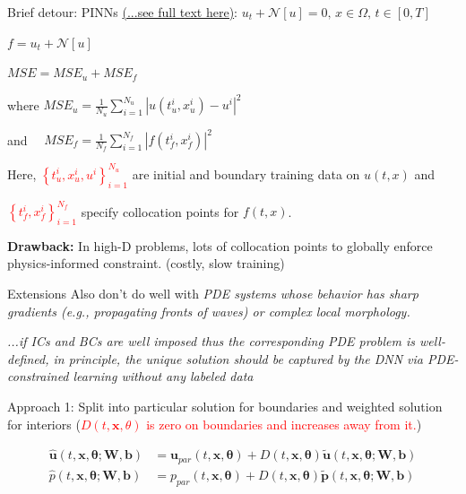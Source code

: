 \documentclass[usenames,dvipsnames]{beamer}
\theoremstyle{definition}
\let\oldcite=\cite
\renewcommand{\cite}[2][]{\textcolor{green}{\oldcite[#1]{#2}}}
\begin{document}
\begin{frame}{Brief detour: PINNs}
  \cite{Raissi2019} \href{www.sciencedirect.com/science/article/pii/S0021999118307125}{(...see full text here)}: 
    $u_t+\mathcal{N}[u]=0, \, x\in\Omega, \, t\in[0,T]$

    $f = u_t+\mathcal{N}[u]$

    $MSE=MSE_u+MSE_f$

    where $MSE_u=\frac{1}{N_u}\sum_{i=1}^{N_u}|u(t_u^i,x_u^i)-u^i|^2$

    and $\quad MSE_f=\frac{1}{N_f}\sum_{i=1}^{N_f}|f(t_f^i,x_f^i)|^2$

    Here, \textcolor{red}{$\left\{t_{u}^{i},x_{u}^{i},u^{i}\right\}_{i=1}^{N_{u}}$} are initial and boundary training data on $u(t, x)$ and 

    \textcolor{red}{$\left\{t_{f}^{i},x_{f}^{i}\right\}_{i=1}^{N_{f}}$} specify collocation points for $f(t, x)$.

    \textbf{Drawback: } In high-D problems, lots of collocation points to globally enforce physics-informed constraint. (costly, slow training)
\end{frame}

\begin{frame}{Extensions}
    Also don't do well with \emph{PDE systems whose behavior has sharp gradients (e.g., propagating fronts of waves) or complex
    local morphology. } \cite{ren_phycrnet:_2022}

    \cite{sun_surrogate_2020} \emph{...if ICs and BCs are well imposed thus the corresponding PDE problem is well-defined, in principle, the unique solution should be captured by the DNN via PDE-constrained learning without any labeled data}

    Approach 1: Split into particular solution for boundaries and weighted solution for interiors (\textcolor{red}{$D(t, \mathbf{x}, \theta)$ is zero on boundaries and increases away from it.})

    $$\begin{aligned}\hat{\mathbf{u}}(t,\mathbf{x},\boldsymbol{\theta};\mathbf{W},\mathbf{b})&=\mathbf{u}_{par}(t,\mathbf{x},\boldsymbol{\theta})+D(t,\mathbf{x},\boldsymbol{\theta})\tilde{\mathbf{u}}(t,\mathbf{x},\boldsymbol{\theta};\mathbf{W},\mathbf{b})\\\hat{p}(t,\mathbf{x},\boldsymbol{\theta};\mathbf{W},\mathbf{b})&=p_{par}(t,\mathbf{x},\boldsymbol{\theta})+D(t,\mathbf{x},\boldsymbol{\theta})\tilde{\boldsymbol{p}}(t,\mathbf{x},\boldsymbol{\theta};\mathbf{W},\mathbf{b})\end{aligned}$$
\end{frame}
\end{document}
